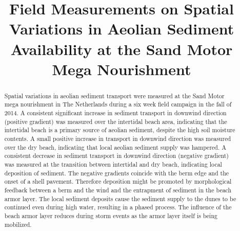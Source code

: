 \documentclass[preprint,12pt,authoryear,a4paper]{elsarticle}
\providecommand{\DIFaddbegin}{} %
\providecommand{\DIFaddend}{} %
\providecommand{\DIFdelbegin}{} %
\providecommand{\DIFdelend}{} %
\begin{document}
\begin{frontmatter}

  \title{Field Measurements on Spatial Variations in Aeolian Sediment
    Availability at the Sand Motor Mega Nourishment}

  \DIFdelbegin %
\DIFdelend %

  \DIFdelbegin %



\DIFdelend \begin{abstract}
    \DIFaddbegin 

    \DIFaddend Spatial variations in aeolian sediment transport were measured at
    the Sand Motor mega nourishment in The Netherlands during a six
    week field campaign in the fall of 2014. A consistent significant
    increase in sediment transport in downwind direction (positive
    gradient) was measured over the intertidal beach area, indicating
    that the intertidal beach is a primary source of aeolian sediment,
    despite the high soil moisture contents. A small positive increase
    in transport in downwind direction was measured over the dry
    beach, indicating that local aeolian sediment supply was
    hampered. A consistent decrease in sediment transport in downwind
    direction (negative gradient) was measured at the transition
    between intertidal and dry beach, indicating local deposition of
    sediment. The negative gradients coincide with the berm edge and
    the onset of a shell pavement. Therefore deposition might be
    promoted by morphological feedback between a berm and the wind and
    the entrapment of sediment in the beach armor layer. The local
    sediment deposits cause the sediment supply to the dunes to be
    continued even during high water, resulting in a phased
    process. The influence of the beach armor layer reduces during
    storm events as the armor layer itself is being
    mobilized.
\DIFaddbegin 


\end{abstract}
\end{frontmatter}
\end{document}
